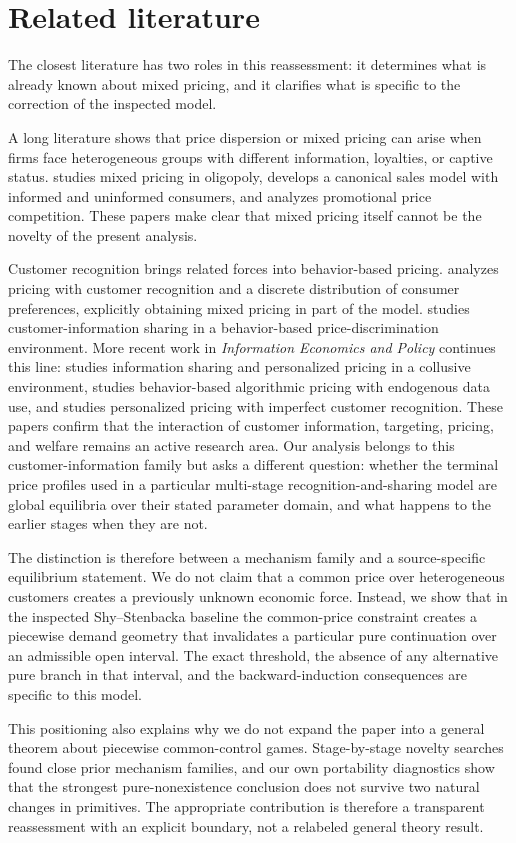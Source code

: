 \section{Related literature}\label{sec:literature}

The closest literature has two roles in this reassessment: it determines what is already known about mixed pricing, and it clarifies what is specific to the correction of the inspected model.

A long literature shows that price dispersion or mixed pricing can arise when firms face heterogeneous groups with different information, loyalties, or captive status.  \citet{Shilony1977} studies mixed pricing in oligopoly, \citet{Varian1980} develops a canonical sales model with informed and uninformed consumers, and \citet{Narasimhan1988} analyzes promotional price competition.  These papers make clear that mixed pricing itself cannot be the novelty of the present analysis.

Customer recognition brings related forces into behavior-based pricing.  \citet{Esteves2010} analyzes pricing with customer recognition and a discrete distribution of consumer preferences, explicitly obtaining mixed pricing in part of the model.  \citet{deNijs2017} studies customer-information sharing in a behavior-based price-discrimination environment.  More recent work in \emph{Information Economics and Policy} continues this line: \citet{ColomboFilippiniPignataro2024} studies information sharing and personalized pricing in a collusive environment, \citet{Dubus2024} studies behavior-based algorithmic pricing with endogenous data use, and \citet{ColomboGrazianoPignataro2025} studies personalized pricing with imperfect customer recognition.  These papers confirm that the interaction of customer information, targeting, pricing, and welfare remains an active research area.  Our analysis belongs to this customer-information family but asks a different question: whether the terminal price profiles used in a particular multi-stage recognition-and-sharing model are global equilibria over their stated parameter domain, and what happens to the earlier stages when they are not.

The distinction is therefore between a mechanism family and a source-specific equilibrium statement.  We do not claim that a common price over heterogeneous customers creates a previously unknown economic force.  Instead, we show that in the inspected Shy--Stenbacka baseline the common-price constraint creates a piecewise demand geometry that invalidates a particular pure continuation over an admissible open interval.  The exact threshold, the absence of any alternative pure branch in that interval, and the backward-induction consequences are specific to this model.

This positioning also explains why we do not expand the paper into a general theorem about piecewise common-control games.  Stage-by-stage novelty searches found close prior mechanism families, and our own portability diagnostics show that the strongest pure-nonexistence conclusion does not survive two natural changes in primitives.  The appropriate contribution is therefore a transparent reassessment with an explicit boundary, not a relabeled general theory result.
